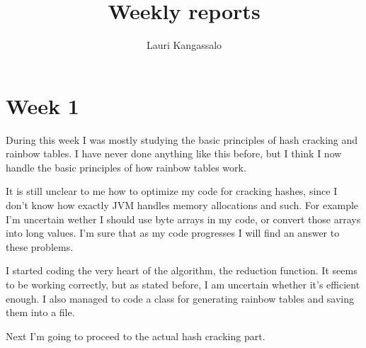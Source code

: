 \documentclass[a4paper, 11pt, finnish]{article}
\title{Weekly reports}
\author{Lauri Kangassalo}
\begin{document}
  \maketitle
\section*{Week 1}
During this week I was mostly studying the basic principles of hash cracking and rainbow tables. I have never done anything like this before, but I think I now handle the basic principles of how rainbow tables work.

It is still unclear to me how to optimize my code for cracking hashes, since I don't know how exactly JVM handles memory allocations and such. For example I'm uncertain wether I should use byte arrays in my code, or convert those arrays into long values. I'm sure that as my code progresses I will find an answer to these problems.

I started coding the very heart of the algorithm, the reduction function. It seems to be working correctly, but as stated before, I am uncertain whether it's efficient enough. I also managed to code a class for generating rainbow tables and saving them into a file.

Next I'm going to proceed to the actual hash cracking part.
\end{document}
